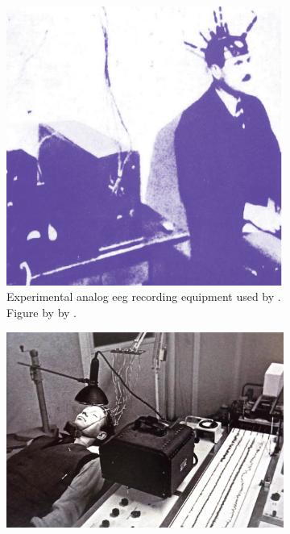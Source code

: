 \begin{figure}[ht]
  \begin{minipage}{\textwidth}
    \centering
    \begin{subfigure}{.48\textwidth}
        \centering
        \includegraphics[width=\textwidth]{images/hardware/berger_hardware.png}
        \captionsetup{width=0.9\linewidth}
        \captionsetup{justification=centering}
        \caption{Experimental analog \gls{eeg} recording equipment used by \citet{human_eeg_discovery}.\\Figure by by \citet{oldest_eeg_hardware}.}
        \label{fig:eeg_hardware_evolution_1}
    \end{subfigure}
    \hfill
    \begin{subfigure}{.48\textwidth}
        \centering
        \includegraphics[width=\textwidth]{images/hardware/eeg_1950.jpg}

\end{subfigure}
\end{minipage}
\end{figure}
